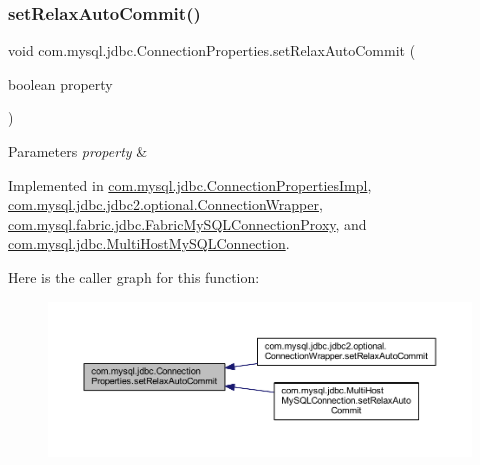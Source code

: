 \subsubsection{\texorpdfstring{set\+Relax\+Auto\+Commit()}{setRelaxAutoCommit()}}
{\footnotesize\ttfamily void com.\+mysql.\+jdbc.\+Connection\+Properties.\+set\+Relax\+Auto\+Commit (\begin{DoxyParamCaption}\item[{boolean}]{property }\end{DoxyParamCaption})}


\begin{DoxyParams}{Parameters}
{\em property} & \\
\hline
\end{DoxyParams}


Implemented in \mbox{\hyperlink{classcom_1_1mysql_1_1jdbc_1_1_connection_properties_impl_a0b43ac232583f9bc628367fb8191f1e0}{com.\+mysql.\+jdbc.\+Connection\+Properties\+Impl}}, \mbox{\hyperlink{classcom_1_1mysql_1_1jdbc_1_1jdbc2_1_1optional_1_1_connection_wrapper_af338a10a5b9e993703c9e21810e74b21}{com.\+mysql.\+jdbc.\+jdbc2.\+optional.\+Connection\+Wrapper}}, \mbox{\hyperlink{classcom_1_1mysql_1_1fabric_1_1jdbc_1_1_fabric_my_s_q_l_connection_proxy_abcf0cc71969650c82931b9c0769bcc28}{com.\+mysql.\+fabric.\+jdbc.\+Fabric\+My\+S\+Q\+L\+Connection\+Proxy}}, and \mbox{\hyperlink{classcom_1_1mysql_1_1jdbc_1_1_multi_host_my_s_q_l_connection_adb974ee9a13de24aeadca3f29dc01549}{com.\+mysql.\+jdbc.\+Multi\+Host\+My\+S\+Q\+L\+Connection}}.

Here is the caller graph for this function\+:\nopagebreak
\begin{figure}[H]
\begin{center}
\leavevmode
\includegraphics[width=350pt]{interfacecom_1_1mysql_1_1jdbc_1_1_connection_properties_a2b1a30e309c80866f41d0bc85d16e958_icgraph}
\end{center}
\end{figure}
\mbox{\label{interfacecom_1_1mysql_1_1jdbc_1_1_connection_properties_a98e28b386c63acdab88d1fdc0531d8ce}} 
